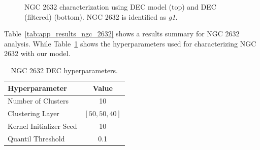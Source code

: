 \documentclass[11pt,a4paper,english,twocolumn]{article}
\begin{document}
\begin{figure}[htbp]
\begin{subfigure}{\columnwidth}
\begin{subfigure}[t]{0.30\textwidth}
    \end{subfigure}
  \end{subfigure}
  \caption{NGC 2632 characterization using DEC model (top) and DEC (filtered) (bottom).
           NGC 2632 is identified as \emph{g1}.}
  \label{fig:app_result_ngc_2632_dec}
\end{figure}

\begin{table}[htbp]
  \begin{center}
    \caption{NGC 2632 results.}
    \label{tab:app_results_ngc_2632}
  \end{center}
\end{table}

Table~\ref{tab:app_results_ngc_2632} shows a results summary for NGC 2632 analysis.
While Table~\ref{tab:app_hyperparameters_ngc_2632} shows the hyperparameters
used for characterizing NGC 2632 with our model.

\begin{table}[htbp]
  \begin{center}
    \begin{tabular}{l|c}
      \textbf{Hyperparameter} & \textbf{Value} \\
      \hline
      Number of Clusters & 10 \\
      Clustering Layer & \(\left[ 50, 50, 40 \right]\) \\
      Kernel Initializer Seed & 10 \\
      Quantil Threshold & 0.1 \\
    \end{tabular}
    \caption{NGC 2632 DEC hyperparameters.}
    \label{tab:app_hyperparameters_ngc_2632}
  \end{center}
\end{table}
\end{document}
